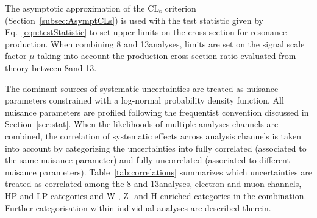 The asymptotic approximation of the $\mathrm{CL_s}$ criterion (Section~\ref{subsec:AsymptCLs}) is used with the test statistic given by Eq.~\ref{eqn:testStatistic} to set upper limits on the cross section for resonance production.
When combining 8 and 13\TeV analyses, limits are set on the signal scale factor $\mu$ taking into account the production cross section ratio evaluated from theory between 8\TeV and 13\TeV.

The dominant sources of systematic uncertainties are treated as nuisance parameters constrained with a log-normal probability density function.
All nuisance parameters are profiled following the frequentist convention discussed in Section~\ref{sec:stat}.
When the likelihoods of multiple analyses channels are combined, the correlation of systematic effects across analysis channels is taken into account by categorizing the uncertainties into fully correlated (associated to the same nuisance parameter) and fully uncorrelated (associated to different nuisance parameters).
Table~\ref{tab:correlations} summarizes which uncertainties are treated as correlated among the 8 and 13\TeV analyses, electron and muon channels, HP and LP categories and W-, Z- and H-enriched categories in the combination.
Further categorisation within individual analyses are described therein.

